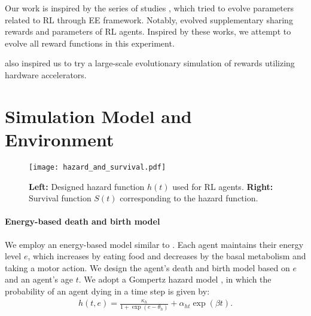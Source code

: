 Our work is inspired by the series of studies \citep{elfwingBiologicallyInspiredEmbodied2005,elfwingDarwinianEmbodiedEvolution2011,elfwingEmergencePolymorphicMating2014}, which tried to evolve parameters related to RL through EE framework. Notably, \citet{elfwingDarwinianEmbodiedEvolution2011} evolved supplementary sharing rewards and parameters of RL agents.
Inspired by these works, we attempt to evolve all reward functions in this experiment.

\citet{zhengWhatCanLearned2020} also inspired us to try a large-scale evolutionary simulation of rewards utilizing hardware accelerators.

\section{Simulation Model and Environment}\label{sec:method}

\begin{figure}[t]
  \centering{}
  \texttt{[image: hazard\_and\_survival.pdf]}
  \caption{
    \textbf{Left:} Designed hazard function $h(t)$ used for RL agents.
    \textbf{Right:} Survival function $S(t)$ corresponding to the hazard function.
  }\label{figure:hs}
\end{figure}

\paragraph{Energy-based death and birth model}
We employ an energy-based model similar to \citet{hamonEcoevolutionaryDynamicsNonepisodic2023}. Each agent maintains their energy level $e$, %
which increases by eating food and decreases by the basal metabolism and taking a motor action. 
We design the agent's death and birth model
based on $e$ and an agent's age $t$.
We adopt a Gompertz hazard model \citep{gompertzXXIVNatureFunction1825,kirkwoodDecipheringDeathCommentary2015}, in which the probability of an agent dying in a time step is given by:
\begin{align}
  h(t, e) = \frac{\kappa_{h}}{1 +  \exp(e - \theta_h)} + \alpha_{ht} \exp(\beta t). 
  \label{eq:h}
\end{align}

